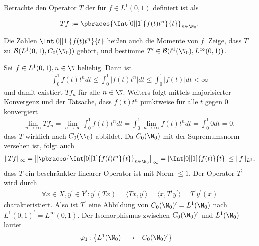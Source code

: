 \begin{exercise}[18/1]

Betrachte den Operator $T$ der für $f \in L^1(0, 1)$ definiert ist als

\begin{align*}
  T f
  :=
  \pbraces{\Int[0][1]{f(t) t^n}{t}}_{n \in \N_0}.
\end{align*}

Die Zahlen $\Int[0][1]{f(t) t^n}{t}$ heißen auch die Momente von $f$.
Zeige, dass $T$ zu $\mathcal{B}(L^1(0, 1), C_0(\N_0))$ gehört, und bestimme $T^\prime \in \mathcal{B}(\ell^1(\N_0), L^\infty(0, 1))$.

\end{exercise}

\begin{solution}
Sei $f \in L^1(0,1), n \in \N$ beliebig. Dann ist
\begin{align*}
  \int_0^1 f(t)t^n dt \leq   \int_0^1|f(t)t^n|dt \leq \int_0^1 |f(t)| dt < \infty
\end{align*}
und damit existiert $Tf_n$ für alle $n \in \N$. Weiters folgt mittels majorisierter
Konvergenz und der Tatsache, dass $f(t)t^n$ punktweise für alle $t$ gegen $0$ konvergiert
\begin{align*}
  \lim_{n \to \infty} Tf_n = \lim_{n \to \infty} \int_0^1 f(t)t^n dt
  =  \int_0^1 \lim_{n \to \infty}f(t)t^n dt = \int_0^1 0 dt= 0,
\end{align*}
dass $T$ wirklich nach $C_0(\N_0)$ abbildet. Da $C_0(\N_0)$ mit der Supremumsnorm
versehen ist, folgt auch
\begin{align*}
  \|Tf\|_{\infty} = \left\|\pbraces{\Int[0][1]{f(t) t^n}{t}}_{n \in \N_0}\right\|_{\infty} =
  \left|\Int[0][1]{f(t)}{t}\right| \leq \|f\|_{L^1},
\end{align*}
dass $T$ ein beschränkter linearer Operator ist mit Norm $\leq 1$.
Der Operator $T^{\prime}$ wird durch
\begin{align*}
  \forall x \in X, y^{\prime} \in Y^{\prime}:
  y^{\prime}(Tx) = \langle Tx,y^{\prime} \rangle =
  \langle x, T^{\prime}y^{\prime}\rangle = T^{\prime}y^{\prime}(x)
\end{align*}
charakteristiert. Also ist $T^{\prime}$ eine Abbildung von $C_0(\N_0)^{\prime} = L^1(\N_0)$
nach $L^1(0, 1)^{\prime} = L^\infty(0, 1)$.
Der Isomorphismus zwischen $C_0(\N_0)^{\prime}$ und $L^1(\N_0)$ lautet
\begin{align*}
  \varphi_1:& \begin{Bmatrix}
    L^1(\N_0) & \to & C_0(\N_0)^{\prime} \\

\end{Bmatrix}
\end{align*}
\end{solution}
